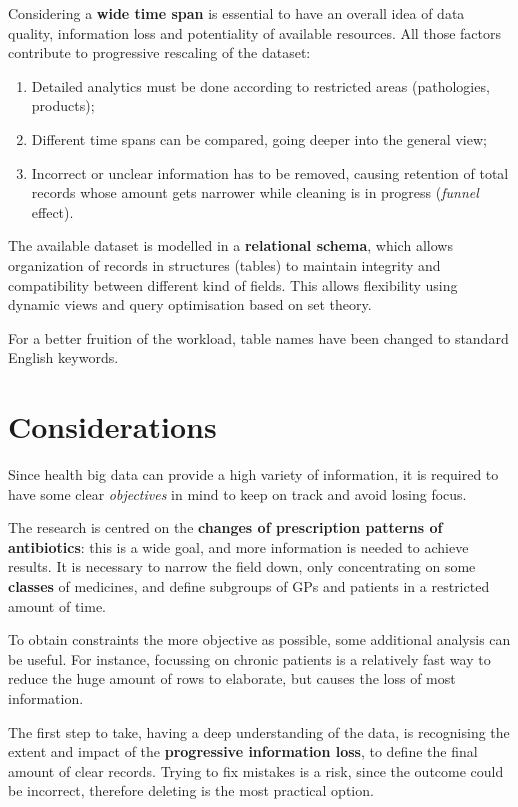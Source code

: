 Considering a \textbf{wide time span} is essential to have an overall idea of data quality, information loss and potentiality of available resources. All those factors contribute to progressive rescaling of the dataset:
\begin{enumerate}
	\item Detailed analytics must be done according to restricted areas (pathologies, products);
	\item Different time spans can be compared, going deeper into the general view;
	\item Incorrect or unclear information has to be removed, causing retention of total records whose amount gets narrower while cleaning is in progress (\textit{funnel} effect).
\end{enumerate}

The available dataset is modelled in a \textbf{relational schema}, which allows organization of records in structures (tables) to maintain integrity and compatibility between different kind of fields. This allows flexibility using dynamic views and query optimisation based on set theory. 

For a better fruition of the workload, table names have been changed to standard English keywords.

\section{Considerations}
Since health big data can provide a high variety of information, it is required to have some clear \textit{objectives} in mind to keep on track and avoid losing focus. 

The research is centred on the \textbf{changes of prescription patterns of antibiotics}: this is a wide goal, and more information is needed to achieve results. It is necessary to narrow the field down, only concentrating on some \textbf{classes} of medicines, and define subgroups of GPs and patients in a restricted amount of time.

To obtain constraints the more objective as possible, some additional analysis can be useful. For instance, focussing on chronic patients is a relatively fast way to reduce the huge amount of rows to elaborate, but causes the loss of most information.

The first step to take, having a deep understanding of the data, is recognising the extent and impact of the \textbf{progressive information loss}, to define the final amount of clear records. Trying to fix mistakes is a risk, since the outcome could be incorrect, therefore deleting is the most practical option.

